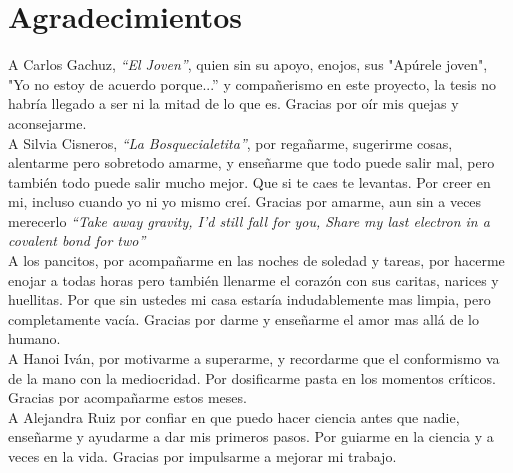 \documentclass[12pt,letterpaper,final]{article}
\renewenvironment{acknowledgements}
{\newpage\section*{Agradecimientos}\begin{singlespace}\normalsize}
	{\end{singlespace}\par\newpage}
\begin{document}
\begin{acknowledgements}

 
 \vspace*{\fill} \begin{center} \begin{minipage}{\textwidth}\begin{small}  \end{small} \end{minipage} \end{center} \vfill

\newpage

A Carlos Gachuz, \textit{``El Joven''}, quien sin su apoyo, enojos, sus "Apúrele joven", "Yo no estoy de acuerdo porque...''  y compañerismo  en este proyecto, la tesis no habría llegado a ser ni la mitad de lo que es. Gracias por oír mis quejas y aconsejarme. \\

A Silvia Cisneros, \textit{``La Bosquecialetita''}, por regañarme, sugerirme cosas, alentarme pero sobretodo amarme, y enseñarme que todo puede salir mal, pero también todo puede salir mucho mejor. Que si te caes te levantas.
Por creer en mi, incluso cuando yo ni yo mismo creí. Gracias por amarme, aun sin a veces merecerlo \emph{``Take away gravity, I'd still fall for you, Share my last electron in a covalent bond for two''}\\

A los pancitos, por acompañarme en las noches de soledad y tareas, por hacerme enojar a todas horas pero también llenarme el corazón con sus caritas, narices y huellitas. Por que sin ustedes mi casa estaría indudablemente mas limpia, pero completamente vacía. Gracias por darme y enseñarme el amor mas allá de lo humano.\\

A Hanoi Iván, por motivarme a superarme, y recordarme que el conformismo va de la mano con la mediocridad. Por dosificarme pasta en los momentos críticos. Gracias por acompañarme estos meses.\\

A Alejandra Ruiz por confiar en que puedo hacer ciencia antes que nadie, enseñarme y ayudarme a dar mis primeros pasos. Por guiarme en la ciencia y a veces en la vida. Gracias por impulsarme a mejorar mi trabajo.\\


\end{acknowledgements}
\end{document}
